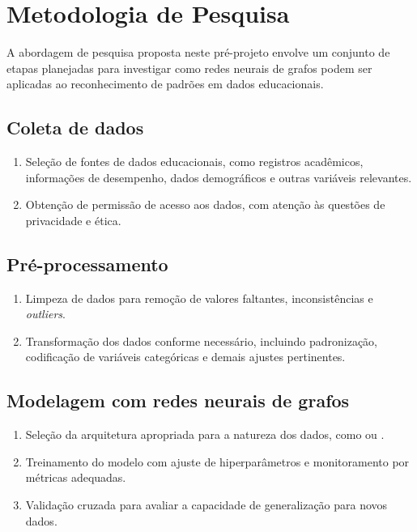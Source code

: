 \chapter{Metodologia de Pesquisa}
\label{pre:metodologia}

A abordagem de pesquisa proposta neste pr\'e-projeto envolve um conjunto de etapas planejadas para investigar como redes neurais de grafos podem ser aplicadas ao reconhecimento de padr\~oes em dados educacionais.

\section{Coleta de dados}

\begin{enumerate}
    \item Sele\c{c}\~ao de fontes de dados educacionais, como registros acad\^emicos, informa\c{c}\~oes de desempenho, dados demogr\'aficos e outras vari\'aveis relevantes.
    \item Obten\c{c}\~ao de permiss\~ao de acesso aos dados, com aten\c{c}\~ao \`as quest\~oes de privacidade e \'etica.
\end{enumerate}

\section{Pr\'e-processamento}

\begin{enumerate}
    \item Limpeza de dados para remo\c{c}\~ao de valores faltantes, inconsist\^encias e \textit{outliers}.
    \item Transforma\c{c}\~ao dos dados conforme necess\'ario, incluindo padroniza\c{c}\~ao, codifica\c{c}\~ao de vari\'aveis categ\'oricas e demais ajustes pertinentes.
\end{enumerate}

\section{Modelagem com redes neurais de grafos}

\begin{enumerate}
    \item Sele\c{c}\~ao da arquitetura apropriada para a natureza dos dados, como  ou .
    \item Treinamento do modelo com ajuste de hiperpar\^ametros e monitoramento por m\'etricas adequadas.
    \item Valida\c{c}\~ao cruzada para avaliar a capacidade de generaliza\c{c}\~ao para novos dados.
\end{enumerate}

